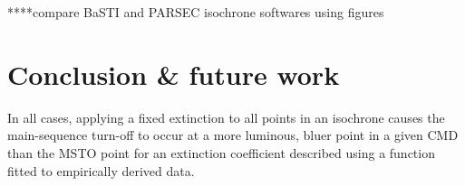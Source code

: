\documentclass[12pt, a4paper]{report}
\begin{document}
****compare BaSTI and PARSEC isochrone softwares using \cite{2019MNRAS.483.4949G} figures

\chapter{Conclusion & future work}
In all cases, applying a fixed extinction to all points in an isochrone causes the main-sequence turn-off to occur at a more luminous, bluer point in a given CMD than the MSTO point for an extinction coefficient described using a function fitted to empirically derived data.

%

\end{document}
